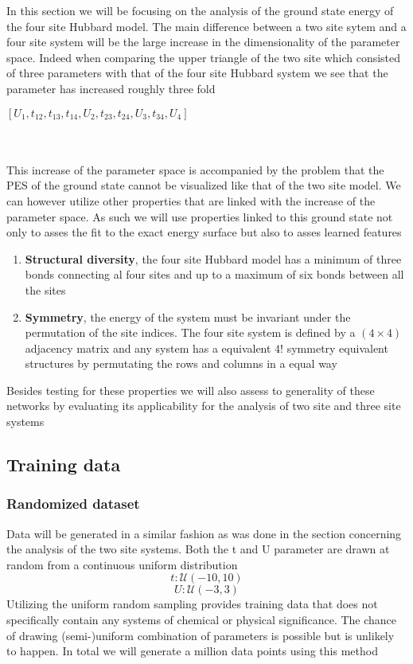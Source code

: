 \documentclass[12pt]{article}
\begin{document}
In this section we will be focusing on the analysis of the ground state energy of the four site Hubbard model. The main difference between a two site sytem and a four site system will be the large increase in the dimensionality of the parameter space. Indeed when comparing the upper triangle of the two site which consisted of three parameters with that of the four site Hubbard system we see that the parameter has increased roughly three fold
\begin{center}
	$\left[ U_1 , t_{12}, t_{13}, t_{14}, U_2, t_{23}, t_{24}, U_3, t_{34},U_4 \right]$
\end{center}
\\
\\
This increase of the parameter space is accompanied by the problem that the PES of the ground state cannot be visualized like that of the two site model. We can however utilize other properties that are linked with the increase of the parameter space. As such we will use properties linked to this ground state not only to asses the fit to the exact energy surface but also to asses learned features
\begin{enumerate}
	\item \textbf{Structural diversity}, the four site Hubbard model has a minimum of three bonds connecting al four sites and up to a maximum of six bonds between all the sites
	\item \textbf{Symmetry}, the energy of the system must be invariant under the permutation of the site indices. The four site system is defined by a $\left(4\times4\right)$ adjacency matrix and any system has a equivalent $4!$ symmetry equivalent structures by permutating the rows and columns in a equal way \cite{Essler2005}
\end{enumerate}
Besides testing for these properties we will also assess to generality of these networks by evaluating its applicability for the analysis of two site and three site systems   

\subsection{Training data}

\subsubsection{Randomized dataset}
Data will be generated in a similar fashion as was done in the section concerning the analysis of the two site systems. Both the t and U parameter are drawn at random from a continuous uniform distribution
\begin{equation*}
t : \mathcal{U}(-10,10)
\end{equation*}
\begin{equation*}
U: \mathcal{U}(-3, 3)
\end{equation*}
Utilizing the uniform random sampling provides training data that does not specifically contain any systems of chemical or physical significance. The chance of drawing (semi-)uniform combination of parameters is possible but is unlikely to happen. In total we will generate a million data points using this method  
\end{document}
